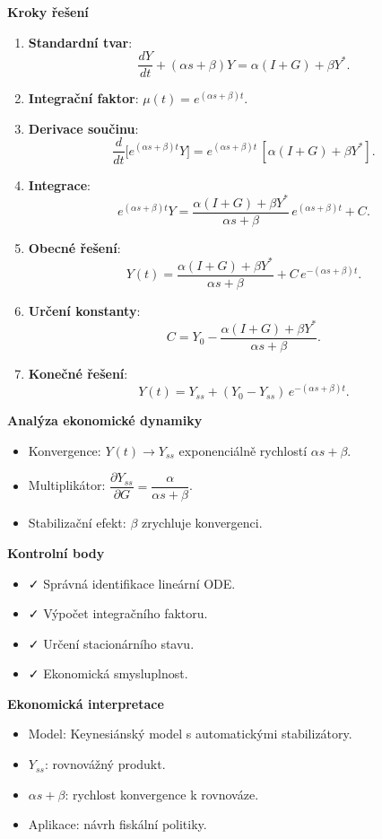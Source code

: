 \begin{example}
\noindent\textbf{Kroky řešení}
\begin{enumerate}
\item \textbf{Standardní tvar}:
\[
\frac{dY}{dt} + (\alpha s + \beta)Y = \alpha(I + G) + \beta Y^*.
\]
\item \textbf{Integrační faktor}: $\mu(t) = e^{(\alpha s + \beta)t}$.
\item \textbf{Derivace součinu}:
\[
\frac{d}{dt}\!\big[e^{(\alpha s + \beta)t}Y\big] = e^{(\alpha s + \beta)t}\,[\alpha(I + G) + \beta Y^*].
\]
\item \textbf{Integrace}:
\[
e^{(\alpha s + \beta)t}Y = \frac{\alpha(I + G) + \beta Y^*}{\alpha s + \beta}\,e^{(\alpha s + \beta)t} + C.
\]
\item \textbf{Obecné řešení}:
\[
Y(t) = \frac{\alpha(I + G) + \beta Y^*}{\alpha s + \beta} + C\,e^{-(\alpha s + \beta)t}.
\]
\item \textbf{Určení konstanty}:
\[
C = Y_0 - \frac{\alpha(I + G) + \beta Y^*}{\alpha s + \beta}.
\]
\item \textbf{Konečné řešení}:
\[
Y(t) = Y_{ss} + (Y_0 - Y_{ss})\,e^{-(\alpha s + \beta)t}.
\]
\end{enumerate}

\noindent\textbf{Analýza ekonomické dynamiky}
\begin{itemize}
\item Konvergence: $Y(t) \to Y_{ss}$ exponenciálně rychlostí $\alpha s + \beta$.
\item Multiplikátor: $\dfrac{\partial Y_{ss}}{\partial G} = \dfrac{\alpha}{\alpha s + \beta}$.
\item Stabilizační efekt: $\beta$ zrychluje konvergenci.
\end{itemize}

\noindent\textbf{Kontrolní body}
\begin{itemize}
\item ✓ Správná identifikace lineární ODE.
\item ✓ Výpočet integračního faktoru.
\item ✓ Určení stacionárního stavu.
\item ✓ Ekonomická smysluplnost.
\end{itemize}

\noindent\textbf{Ekonomická interpretace}
\begin{itemize}
\item Model: Keynesiánský model s automatickými stabilizátory.
\item $Y_{ss}$: rovnovážný produkt.
\item $\alpha s + \beta$: rychlost konvergence k rovnováze.
\item Aplikace: návrh fiskální politiky.
\end{itemize}


\end{example}
